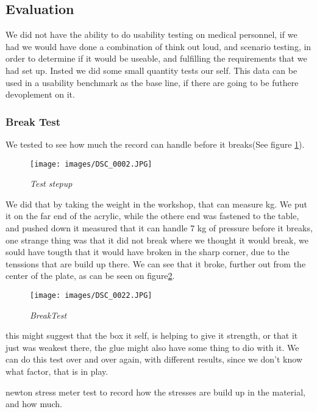 \subsection{Evaluation}
We did not have the ability to do usability testing on medical personnel, if we had we would have done a combination of think out loud, and scenario testing, in order to determine if it would be useable, and fulfilling the requirements that we had set up.
Insted we did some small quantity tests our self.
This data can be used in a usability benchmark as the base line, if there are going to be futhere devoplement on it.

\subsubsection{Break Test}
We tested to see how much the record can handle before it breaks(See figure \ref{fig:BreakTest1}).
\begin{figure}[h]
	\begin{center}
	\texttt{[image: images/DSC\_0002.JPG]}
	\caption{\small {\it {Test stepup}}} \label{fig:BreakTest1}
	\end{center}
\end{figure}
We did that by taking the weight in the workshop, that can measure kg. We put it on the far end of the acrylic, while the othere end was fastened to the table, and pushed down it measured that it can handle 7 kg of pressure before it breaks, one strange thing was that it did not break where we thought it would break, we sould have tougth that it would have broken in the sharp corner\cite{AcrylTension}, due to the tenssions that are build up there. We can see that it broke, further out from the center of the plate, as can be seen on figure\ref{fig:BreakTest2}.
\begin{figure}[h]
	\begin{center}
	\texttt{[image: images/DSC\_0022.JPG]}
	\caption{\small {\it {BreakTest}}} \label{fig:BreakTest2}
	\end{center}
\end{figure}
this might suggest that the box it self, is helping to give it strength, or that it just was weakest there, the glue might also have some thing to dio with it.
We can do this test over and over again, with different results, since we don't know what factor, that is in play.

newton stress meter test to record how the stresses are build up in the material, and how much.

